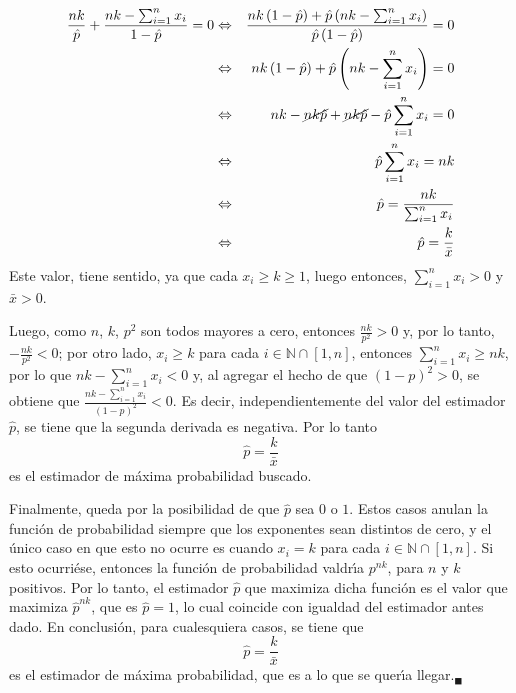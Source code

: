 \begin{solucion}
 \begin{eqnarray*}
  \frac{nk}{\hat{p}} + \frac{nk - \sum_{i=1}^n x_i}{1-\hat{p}} = 0 & \Leftrightarrow & \frac{nk\left(1-\hat{p}\right) + \hat{p}\left( nk - \sum_{i=1}^n x_i \right)}{\hat{p}\left(1-\hat{p}\right)} = 0 \\
  & \Leftrightarrow & nk\left(1-\hat{p}\right) + \hat{p}\left( nk - \sum_{i=1}^n x_i \right) = 0 \\
  & \Leftrightarrow & nk - \cancel{ nk\hat{p}}  + \cancel{ nk\hat{p} } - \hat{p}\sum_{i=1}^{n} x_i = 0 \\
  & \Leftrightarrow & \hat{p}\sum_{i=1}^{n} x_i = nk \\
  & \Leftrightarrow & \hat{p} = \frac{nk}{\sum_{i=1}^n x_i} \\
  & \Leftrightarrow & \hat{p} = \frac{k}{\bar{x}}
 \end{eqnarray*}
 Este valor, tiene sentido, ya que cada $x_i \geq k \geq 1$, luego entonces, $\sum_{i=1}^n x_i > 0$ y $\bar{x} > 0$.
 \par 
 Luego, como $n$, $k$, $p^2$ son todos mayores a cero, entonces $\frac{nk}{p^2} > 0$ y, por lo tanto, $-\frac{nk}{p^2} < 0$; por otro lado, $x_i \geq k$ para cada $i \in \mathbb{N}\cap[1,n]$, entonces $\sum_{i=1}^n x_i \geq nk$, por lo que $nk-\sum_{i=1}^n x_i < 0$ y, al agregar el hecho de que $(1-p)^2 > 0$, se obtiene que $\frac{nk - \sum_{i=1}^n x_i}{(1-p)^2} < 0$. Es decir, independientemente del valor del estimador $\hat{p}$, se tiene que la segunda derivada es negativa. Por lo tanto
 \begin{equation*}
  \hat{p} = \frac{k}{\bar{x}}
 \end{equation*}
 es el estimador de m\'axima probabilidad buscado. 
 \par 
 Finalmente, queda por la posibilidad de que $\hat{p}$ sea $0$ o $1$. Estos casos anulan la funci\'on de probabilidad siempre que los exponentes sean distintos de cero, y el \'unico caso en que esto no ocurre es cuando $x_i = k$ para cada $i \in \mathbb{N} \cap [1,n]$. Si esto ocurri\'ese, entonces la funci\'on de probabilidad valdr\'{\i}a $p^{nk}$, para $n$ y $k$ positivos. Por lo tanto, el estimador $\hat{p}$ que maximiza dicha funci\'on es el valor que maximiza $\hat{p}^{nk}$, que es $\hat{p} = 1$, lo cual coincide con igualdad del estimador antes dado. En conclusi\'on, para cualesquiera casos, se tiene que
 \begin{equation*}
  \hat{p} = \frac{k}{\bar{x}}
 \end{equation*}
 es el estimador de m\'axima probabilidad, que es a lo que se quer\'{\i}a llegar.${}_{\blacksquare}$
\end{solucion}

